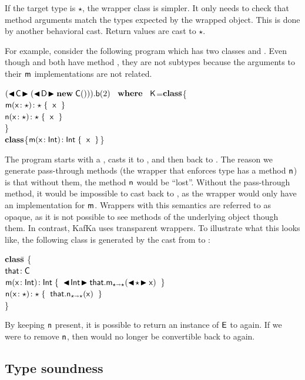 \documentclass[a4paper,UKenglish]{lipics-v2018}
\newcommand{\WHERE}{~\EM{\xt{\bf where}}~}
\newcommand{\HS}{\hspace{.2cm}}
\newcommand{\EM}[1]{\ensuremath{#1}\xspace}
\newcommand{\xt}[1]{{\sf{#1}}}
\newcommand{\bt}[1]{\xt{\bf #1}}
\newcommand{\EMxt}[1]{\EM{\xt{#1}}}
\newcommand{\x}{\EMxt x}
\newcommand{\n}{\EMxt n}
\newcommand{\m}{\EMxt m}
\newcommand{\K}{\EMxt K}
\newcommand{\E}{\EMxt {E}}
\newcommand{\any}{\EM{\star}}
\newcommand{\that}{\EMxt{that}}
\newcommand{\Call}[3]{\EM{#1.#2(#3)}}
\newcommand{\KCall}[5]{\EM{{#1}.{#2}_{{#4} \shortrightarrow {#5}}(#3)}}
\newcommand{\New}[2]{\EM{\new\;#1(#2)}}
\newcommand{\BehStart}{\EM{\blacktriangleleft}}
\newcommand{\BehEnd}{\EM{\blacktriangleright}}
\newcommand{\BehCast}[2]{\EM{\BehStart\! #1\! \BehEnd #2}}
\newcommand{\new}{\EM{\bt{new}}}
\newcommand{\HT}[2]{\EM{{#1}\!:{#2}}}
\newcommand{\Mdef}[5]{\EM{ \HT{ #1( \HT{#2}{#3})}{#4}\;\{{#5}\}}}
\newcommand{\class}{\EM{\bf{class}}}
\newcommand{\Fdef}[2]{\EM{ \HT{#1}{#2} }}
\newcommand{\kafka}{{\sf KafKa}\xspace}
\newcounter{lem}
\newcommand{\Int}{\xt{Int}}
\begin{document}
If the target type is \any, the wrapper class is simpler. It only needs to
check that method arguments match the types expected by the wrapped
object. This is done by another behavioral cast. Return values are cast to
\any.

For example, consider the following program which has two classes \C and \D.
Even though \C and \D both have method \a, they are not subtypes because the
arguments to their \m implementations are not related.

\begin{tabbing}\small
\hspace{1.5em}
\Call{(\BehCast\C{(\BehCast\D{\New\C{}})})}{\xt{b}}{2} \HS\HS\HS\WHERE\HS
\K\HS =\HS \= \class\= \C \{\\
\> \HS \Mdef\m\x\any\any{\HS\x\HS}\\
\> \HS \Mdef\n\x\any\any{\HS\x\HS}\\
\> \} \\
\>\class \D \{\HS \Mdef\m\x\Int\Int{\HS\x\HS}\HS \}
\end{tabbing}
The program starts with a \C, casts it to \D, and then back to \C. The
reason we generate pass-through methods (the wrapper that enforces type \D
has a method \n) is that without them, the method \n would be ``lost''. 
Without the pass-through method, it would be impossible to cast back to
\C, as the wrapper would only have an implementation for \m. Wrappers
with this semantics are referred to as opaque, as it is not possible
to see methods of the underlying object though them. In contrast,
\kafka uses transparent wrappers.
To illustrate what this looks like, the following class \xt E is generated
by the cast from \C to \D:

\begin{tabbing}\small
\hspace{1.5em}
\HS\HS\=\class\= \xt E \{\\
\>\> \HS \Fdef\that\C \\
\>\> \HS \Mdef\m\x\Int\Int{\HS\BehCast\Int{\KCall\that\m{\BehCast\any\x}\any\any\HS}} \\ 
\>\> \HS \Mdef\n\x\any\any{\HS \KCall\that\n{\x}\any\any\HS} \\ 
\>\}
\end{tabbing}
By keeping \n present, it is possible to return an instance of
\E to \C again. If we were to remove \n, then \xt E would no longer
be convertible back to \C again. 

\subsection{Type soundness}
\end{document}
